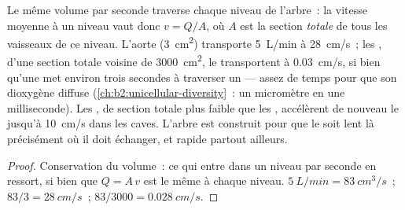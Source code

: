 \begin{theorem}\label{thm:b2:blood-circulation:continuity}
Le même volume par seconde traverse chaque niveau de l'arbre~: la
vitesse moyenne à un niveau vaut donc $v = Q/A$, où $A$ est la section
\emph{totale} de tous les vaisseaux de ce niveau. L'aorte
(\qty{3}{cm^2}) transporte \qty{5}{L/min} à \qty{28}{cm/s}~; les
, d'une section totale voisine de \qty{3000}{cm^2}, le
transportent à \qty{0.03}{cm/s}, si bien qu'une  met environ trois
secondes à traverser un  --- assez de temps pour que son
dioxygène diffuse (\cref{ch:b2:unicellular-diversity}~: un micromètre
en une milliseconde). Les , de section totale plus faible que les
, accélèrent de nouveau le  jusqu'à \qty{10}{cm/s} dans
les  caves. L'arbre est construit pour que le  soit lent là
précisément où il doit échanger, et rapide partout ailleurs.
\end{theorem}
\begin{proof}
Conservation du volume~: ce qui entre dans un niveau par seconde en
ressort, si bien que $Q = A\,v$ est le même à chaque niveau.
$\qty{5}{L/min} =
\qty{83}{cm^3/s}$~; $83/3 = \qty{28}{cm/s}$~; $83/3000 =
\qty{0.028}{cm/s}$.
\end{proof}

